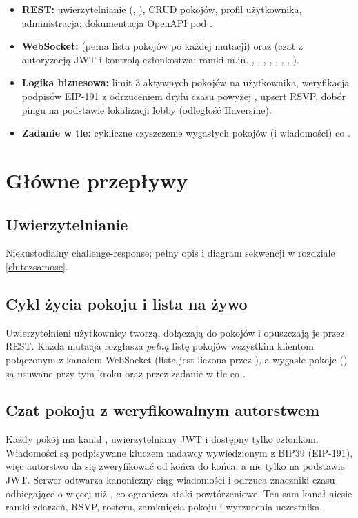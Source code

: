 \begin{itemize}
  \item \textbf{REST:} uwierzytelnianie (, ),
        CRUD pokojów, profil użytkownika, administracja; dokumentacja OpenAPI pod
        .
  \item \textbf{WebSocket:}  (pełna lista pokojów po każdej mutacji) oraz
         (czat z autoryzacją JWT i kontrolą członkostwa; ramki
        m.in. , , , ,
        , , , ).
  \item \textbf{Logika biznesowa:} limit 3 aktywnych pokojów na użytkownika, weryfikacja
        podpisów EIP-191 z odrzuceniem dryfu czasu powyżej
        , upsert RSVP, dobór pingu na podstawie
        lokalizacji lobby (odległość Haversine).
  \item \textbf{Zadanie w tle:} cykliczne czyszczenie wygasłych pokojów (i wiadomości) co
        .
\end{itemize}

\section{Główne przepływy}
\label{sec:arch-przeplywy}

\subsection{Uwierzytelnianie}
Niekustodialny challenge-response; pełny opis i diagram sekwencji w rozdziale
\ref{ch:tozsamosc}.

\subsection{Cykl życia pokoju i lista na żywo}
Uwierzytelnieni użytkownicy tworzą, dołączają do pokojów i opuszczają je przez REST.
Każda mutacja rozgłasza \emph{pełną} listę pokojów wszystkim klientom połączonym z
kanałem WebSocket  (lista jest liczona przez ),
a wygasłe pokoje () są usuwane przy tym kroku oraz przez zadanie w
tle co .

\subsection{Czat pokoju z weryfikowalnym autorstwem}
Każdy pokój ma kanał , uwierzytelniany JWT i dostępny tylko
członkom. Wiadomości są podpisywane kluczem nadawcy wywiedzionym z BIP39 (EIP-191), więc
autorstwo da się zweryfikować od końca do końca, a nie tylko na podstawie JWT. Serwer
odtwarza kanoniczny ciąg wiadomości i odrzuca znaczniki czasu odbiegające o więcej niż
, co ogranicza ataki powtórzeniowe. Ten sam kanał niesie
ramki zdarzeń, RSVP, rosteru, zamknięcia pokoju i wyrzucenia uczestnika.

